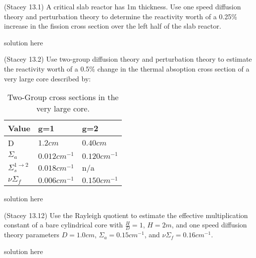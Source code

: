 \documentclass[11pt,answers,addpoints]{exam}
\begin{document}
\begin{questions}

        \question[30] 
        (Stacey 13.1)
        A critical slab reactor has 1m thickness. 
        Use one speed diffusion theory and perturbation theory to 
        determine the reactivity worth of a 0.25\% increase in the fission 
        cross section over the left half of the slab reactor.
        \begin{solution}
                solution here
        \end{solution}

        
        \question[40] 
        (Stacey 13.2)
        Use two-group diffusion theory and perturbation theory to estimate the 
        reactivity worth of a 0.5\% change in the thermal absoption  cross 
        section of a very large core described by:
        
        \begin{table}[h!]
                \centering
                \begin{tabular}{lll}
                        \hline
                        \textbf{Value} & \textbf{g=1} & \textbf{g=2}\\
                        \hline
                        D & $1.2cm$ &  $0.40cm$\\
                        $\Sigma_a$ & $0.012cm^{-1}$ & $0.120cm^{-1}$ \\
                        $\Sigma_s^{1\rightarrow 2}$& $0.018cm^{-1}$ &  n/a \\
                        $\nu\Sigma_f$ & $0.006cm^{-1}$ & $0.150cm^{-1}$\\
                        \hline
                \end{tabular}
                \caption{Two-Group cross sections in the very large core.}
                \label{tab:prob2}
        \end{table}

        \begin{solution}
                solution here
        \end{solution}


        \question[30]
        (Stacey 13.12)
        Use the Rayleigh quotient to estimate the effective 
        multiplication constant of a bare cylindrical core with $\frac{H}{D} 
        =1$, $H=2m$, and one speed diffusion theory parameters $D=1.0cm$, 
        $\Sigma_a=0.15cm^{-1}$, and $\nu\Sigma_f=0.16cm^{-1}$. 
        \begin{solution}
                solution here
        \end{solution}


\end{questions}



%
%
\end{document}
